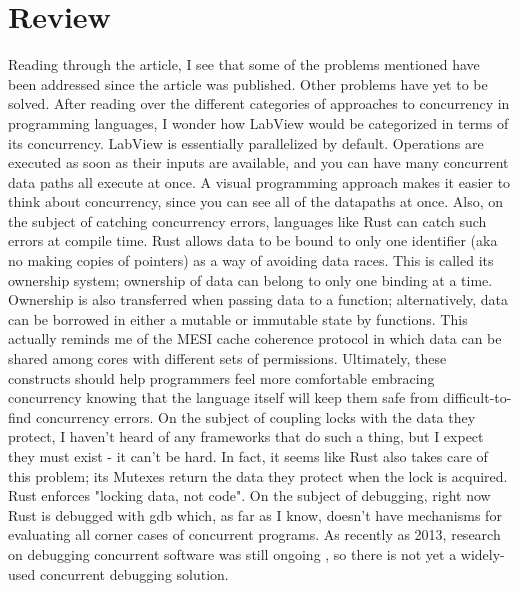 \documentclass{article}
\begin{document}
\section*{Review}
Reading through the article, I see that some of the problems mentioned have been addressed since the article was published. Other problems have yet to be solved. After reading over the different categories of approaches to concurrency in programming languages, I wonder how LabView would be categorized in terms of its concurrency. LabView is essentially parallelized by default. Operations are executed as soon as their inputs are available, and you can have many concurrent data paths all execute at once. A visual programming approach makes it easier to think about concurrency, since you can see all of the datapaths at once. Also, on the subject of catching
concurrency errors, languages like Rust can catch such errors at compile time. Rust allows data to be bound to only one identifier (aka no making copies of pointers) as a way of avoiding data races. This is called its ownership system; ownership of data can belong to only one binding at a time. Ownership is also transferred when passing data to a function; alternatively, data can be borrowed in either a mutable or immutable state by functions. This actually reminds me of the MESI
cache coherence protocol in which data can be shared among cores with different sets of permissions. Ultimately, these constructs should help programmers feel more comfortable embracing concurrency knowing that the language itself will keep them safe from difficult-to-find concurrency errors. On the
subject of coupling locks with the data they protect, I haven't heard of any frameworks that do such a thing, but I expect they must exist - it can't be hard. In fact, it seems like Rust also takes care of this problem; its Mutexes return the data they protect when the lock is acquired. Rust enforces "locking data, not code". On the subject of debugging, right now Rust is debugged with gdb which, as far as I know, doesn't have mechanisms for evaluating all corner cases of concurrent
programs. As recently as 2013, research on debugging concurrent software was still ongoing \cite{Huang:2013}, so there is not yet a widely-used concurrent debugging solution.
\end{document}
